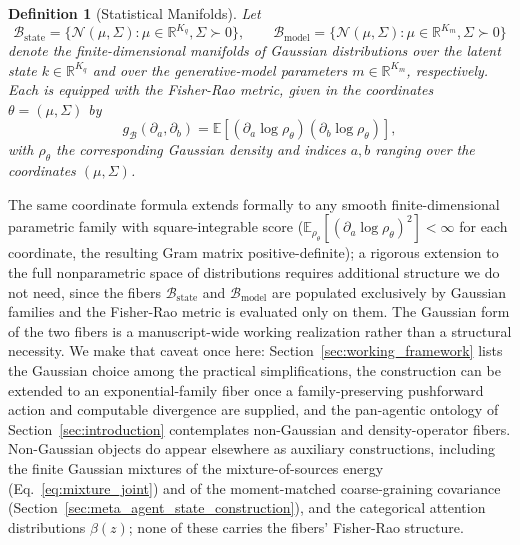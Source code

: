 \documentclass[11pt]{article}
\newtheorem{definition}{Definition}
\begin{document}
\begin{definition}[Statistical Manifolds]
Let
\begin{equation}
\mathcal{B}_{\mathrm{state}} = \{\mathcal{N}(\mu, \Sigma) : \mu \in \mathbb{R}^{K_q}, \Sigma \succ 0\},
\qquad
\mathcal{B}_{\mathrm{model}} = \{\mathcal{N}(\mu, \Sigma) : \mu \in \mathbb{R}^{K_m}, \Sigma \succ 0\}
\end{equation}
denote the finite-dimensional manifolds of Gaussian distributions over the latent state $k \in \mathbb{R}^{K_q}$ and over the generative-model parameters $m \in \mathbb{R}^{K_m}$, respectively. Each is equipped with the Fisher-Rao metric, given in the coordinates $\theta = (\mu, \Sigma)$ by
\begin{equation}
g_{\mathcal{B}}(\partial_a, \partial_b) = \mathbb{E}\left[(\partial_a \log \rho_\theta)(\partial_b \log \rho_\theta)\right],
\end{equation}
with $\rho_\theta$ the corresponding Gaussian density and indices $a, b$ ranging over the coordinates $(\mu, \Sigma)$.
\end{definition}

The same coordinate formula extends formally to any smooth finite-dimensional parametric family with square-integrable score ($\mathbb{E}_{\rho_\theta}[(\partial_a \log\rho_\theta)^2] < \infty$ for each coordinate, the resulting Gram matrix positive-definite); a rigorous extension to the full nonparametric space of distributions requires additional structure we do not need, since the fibers $\mathcal{B}_{\mathrm{state}}$ and $\mathcal{B}_{\mathrm{model}}$ are populated exclusively by Gaussian families and the Fisher-Rao metric is evaluated only on them. The Gaussian form of the two fibers is a manuscript-wide working realization rather than a structural necessity. We make that caveat once here: Section~\ref{sec:working_framework} lists the Gaussian choice among the practical simplifications, the construction can be extended to an exponential-family fiber once a family-preserving pushforward action and computable divergence are supplied, and the pan-agentic ontology of Section~\ref{sec:introduction} contemplates non-Gaussian and density-operator fibers. Non-Gaussian objects do appear elsewhere as auxiliary constructions, including the finite Gaussian mixtures of the mixture-of-sources energy (Eq.~\eqref{eq:mixture_joint}) and of the moment-matched coarse-graining covariance (Section~\ref{sec:meta_agent_state_construction}), and the categorical attention distributions $\beta(z)$; none of these carries the fibers' Fisher-Rao structure.
\end{document}
